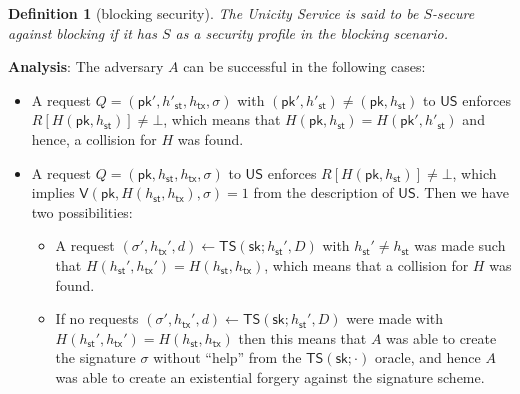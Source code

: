 \documentclass{article}
\newtheorem{definition}{Definition}[section]
\newcommand{\pubkey}[0]{\mathsf{pk}}
\newcommand{\prikey}[0]{\mathsf{sk}}
\newcommand{\sthash}[0]{{h_\mathsf{st}}}
\newcommand{\txhash}[0]{{h_\mathsf{tx}}}
\begin{document}
\begin{definition}[blocking security]
The Unicity Service is said to be $S$-secure against blocking if it has $S$ as a security profile in the blocking scenario.
\end{definition}

\noindent\textbf{Analysis}: The adversary $A$ can be successful in the following cases:
\begin{itemize}
\item[a)] A request $Q=(\pubkey', h'_\mathsf{st}, h_\mathsf{tx}, \sigma)$ with $(\pubkey',h'_\mathsf{st})\neq (\pubkey,h_\mathsf{st})$ to $\mathsf{US}$ enforces $R[H(\pubkey, h_\mathsf{st})]\neq\bot$, which means that  $H(\pubkey,h_\mathsf{st})=H(\pubkey', h'_\mathsf{st})$ and hence, a collision for $H$ was found.
\item[b)] A request $Q=(\pubkey, h_\mathsf{st}, h_\mathsf{tx}, \sigma)$ to $\mathsf{US}$ enforces $R[H(\pubkey, h_\mathsf{st})]\neq\bot$, which implies $\mathsf{V}(\pubkey, H(h_\mathsf{st},h_\mathsf{tx}), \sigma)=1$ from the description of $\mathsf{US}$. Then we have two possibilities:
\begin{itemize}
\item[b1)] A request $(\sigma',\txhash',d)\gets\mathsf{TS}(\prikey;\sthash',D)$ with $\sthash'\neq h_\mathsf{st}$ was made such that
$H(\sthash',\txhash')=H(\sthash,\txhash)$, which means that a collision for $H$ was found.
\item[b2)] If no requests $(\sigma',\txhash',d)\gets\mathsf{TS}(\prikey;\sthash',D)$ were made with $H(\sthash',\txhash')=H(\sthash,\txhash)$ then this means that $A$ was able to create the signature $\sigma$ without ``help'' from the $\mathsf{TS}(\prikey;\cdot)$ oracle, and hence $A$ was able to create an existential forgery against the signature scheme.
\end{itemize}
\end{itemize}
\end{document}
